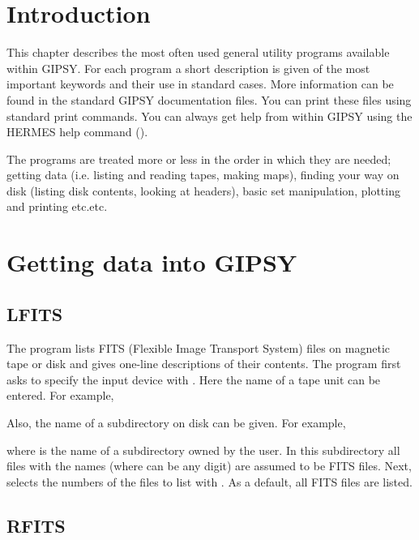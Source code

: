 \label{chapter:general}

\section{Introduction}

This chapter describes the most often used general utility programs
available within GIPSY. For each program a short description is given of
the most important keywords and their use in standard cases. More
information can be found in the standard GIPSY documentation files. You
can print these files using standard print commands. You can always get
help from within GIPSY using the HERMES help command
().

The programs are treated more or less in the order in which they are
needed; getting data (i.e. listing and reading tapes, making maps),
finding your way on disk (listing disk contents, looking at headers),
basic set manipulation, plotting and printing etc.etc.

\section{Getting data into GIPSY}
\subsection*{LFITS}

The program  lists FITS (Flexible Image Transport System)
files on magnetic tape or disk
and gives one-line descriptions of their contents.  The program first
asks to specify the input device with .  Here the name
of a tape unit can be entered.  For example,


Also, the name of a subdirectory on disk can be given. For example,


where  is the name of a subdirectory owned by
the user.  In this subdirectory all files with the names
 (where  can be any digit) are assumed
to be FITS files.  Next,  selects the numbers of the
files to list with .  As a default, all FITS files are
listed. 

\subsection*{RFITS}


